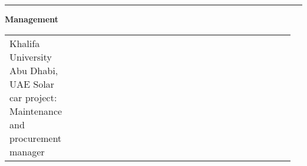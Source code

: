 \documentclass[12pt]{article} %
\begin{document}



\hrule \medskip \textbf{\large Management}\medskip 


\begin{supertabular}{>{\raggedleft\arraybackslash}p{0.19\linewidth}p{0.77\linewidth}} %






	{} %
	{Khalifa University} %
	{Abu Dhabi, UAE} %
	{Solar car project: Maintenance and procurement manager} %
	{}{} %


\end{supertabular}
\end{document}
